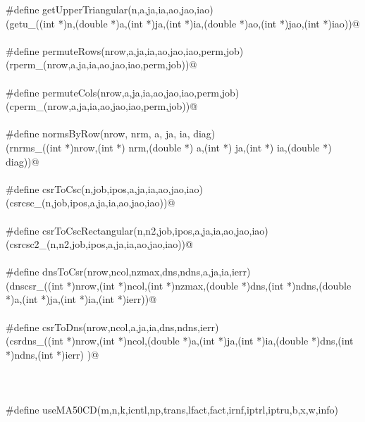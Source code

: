 \documentclass[12pt]{article}
\begin{document}
\begin{flushleft}
\begin{minipage}{\linewidth}
\begin{list}{}{}
\mbox{}\verb@#define getUpperTriangular(n,a,ja,ia,ao,jao,iao)\@\\
\mbox{}\verb@(getu_((int *)n,(double *)a,(int *)ja,(int *)ia,(double *)ao,(int *)jao,(int *)iao))@\\
\mbox{}\verb@@\\
\mbox{}\verb@#define permuteRows(nrow,a,ja,ia,ao,jao,iao,perm,job) \@\\
\mbox{}\verb@(rperm_(nrow,a,ja,ia,ao,jao,iao,perm,job))@\\
\mbox{}\verb@@\\
\mbox{}\verb@#define permuteCols(nrow,a,ja,ia,ao,jao,iao,perm,job) \@\\
\mbox{}\verb@(cperm_(nrow,a,ja,ia,ao,jao,iao,perm,job))@\\
\mbox{}\verb@@\\
\mbox{}\verb@#define normsByRow(nrow, nrm, a, ja, ia, diag) \@\\
\mbox{}\verb@(rnrms_((int *)nrow,(int *) nrm,(double *) a,(int *) ja,(int *) ia,(double *) diag))@\\
\mbox{}\verb@@\\
\mbox{}\verb@#define csrToCsc(n,job,ipos,a,ja,ia,ao,jao,iao) \@\\
\mbox{}\verb@ (csrcsc_(n,job,ipos,a,ja,ia,ao,jao,iao))@\\
\mbox{}\verb@@\\
\mbox{}\verb@#define csrToCscRectangular(n,n2,job,ipos,a,ja,ia,ao,jao,iao)\@\\
\mbox{}\verb@(csrcsc2_(n,n2,job,ipos,a,ja,ia,ao,jao,iao))@\\
\mbox{}\verb@@\\
\mbox{}\verb@#define dnsToCsr(nrow,ncol,nzmax,dns,ndns,a,ja,ia,ierr)\@\\
\mbox{}\verb@(dnscsr_((int *)nrow,(int *)ncol,(int *)nzmax,(double *)dns,(int *)ndns,(double *)a,(int *)ja,(int *)ia,(int *)ierr))@\\
\mbox{}\verb@@\\
\mbox{}\verb@#define csrToDns(nrow,ncol,a,ja,ia,dns,ndns,ierr) \@\\
\mbox{}\verb@(csrdns_((int *)nrow,(int *)ncol,(double *)a,(int *)ja,(int *)ia,(double *)dns,(int *)ndns,(int *)ierr) )@\\
\mbox{}\verb@@\\
\mbox{}\verb@@\\
\mbox{}\verb@@\\
\mbox{}\verb@#define useMA50CD(m,n,k,icntl,np,trans,lfact,fact,irnf,iptrl,iptru,b,x,w,info)\@\\

\end{list}
\end{minipage}
\end{flushleft}
\end{document}
